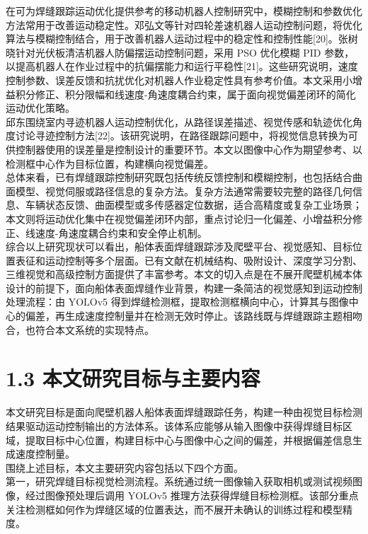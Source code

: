 \documentclass[UTF8,a4paper,12pt]{ctexrep}
\begin{document}
在可为焊缝跟踪运动优化提供参考的移动机器人控制研究中，模糊控制和参数优化方法常用于改善运动稳定性。邓弘文等针对四轮差速机器人运动控制问题，将优化算法与模糊控制结合，用于改善机器人运动过程中的稳定性和控制性能[20]。张树晓针对光伏板清洁机器人防偏摆运动控制问题，采用 PSO 优化模糊 PID 参数，以提高机器人在作业过程中的抗偏摆能力和运行平稳性[21]。这些研究说明，速度控制参数、误差反馈和抗扰优化对机器人作业稳定性具有参考价值。本文采用小增益积分修正、积分限幅和线速度-角速度耦合约束，属于面向视觉偏差闭环的简化运动优化策略。\\

邱东围绕室内寻迹机器人运动控制优化，从路径误差描述、视觉传感和轨迹优化角度讨论寻迹控制方法[22]。该研究说明，在路径跟踪问题中，将视觉信息转换为可供控制器使用的误差量是控制设计的重要环节。本文以图像中心作为期望参考、以检测框中心作为目标位置，构建横向视觉偏差。\\

总体来看，已有焊缝跟踪控制研究既包括传统反馈控制和模糊控制，也包括结合曲面模型、视觉伺服或路径信息的复杂方法。复杂方法通常需要较完整的路径几何信息、车辆状态反馈、曲面模型或多传感器定位数据，适合高精度或复杂工业场景；本文则将运动优化集中在视觉偏差闭环内部，重点讨论归一化偏差、小增益积分修正、线速度-角速度耦合约束和安全停止机制。\\

综合以上研究现状可以看出，船体表面焊缝跟踪涉及爬壁平台、视觉感知、目标位置表征和运动控制等多个层面。已有文献在机械结构、吸附设计、深度学习分割、三维视觉和高级控制方面提供了丰富参考。本文的切入点是在不展开爬壁机械本体设计的前提下，面向船体表面焊缝作业背景，构建一条简洁的视觉感知到运动控制处理流程：由 YOLOv5 得到焊缝检测框，提取检测框横向中心，计算其与图像中心的偏差，再生成速度控制量并在检测无效时停止。该路线既与焊缝跟踪主题相吻合，也符合本文系统的实现特点。\\

\section{1.3 本文研究目标与主要内容}

本文研究目标是面向爬壁机器人船体表面焊缝跟踪任务，构建一种由视觉目标检测结果驱动运动控制输出的方法体系。该体系应能够从输入图像中获得焊缝目标区域，提取目标中心位置，构建目标中心与图像中心之间的偏差，并根据偏差信息生成速度控制量。\\

围绕上述目标，本文主要研究内容包括以下四个方面。\\

第一，研究焊缝目标视觉检测流程。系统通过统一图像输入获取相机或测试视频图像，经过图像预处理后调用 YOLOv5 推理方法获得焊缝目标检测框。该部分重点关注检测框如何作为焊缝区域的位置表达，而不展开未确认的训练过程和模型精度。\\
\end{document}
